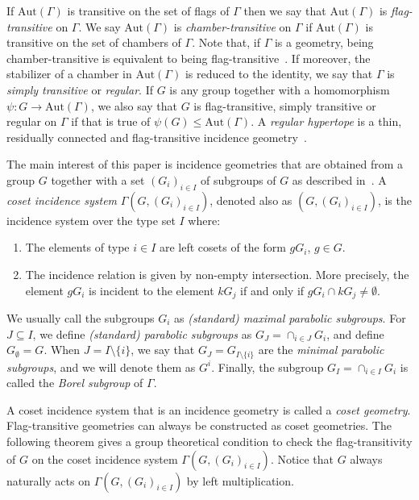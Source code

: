 \documentclass[11pt,letterpaper]{amsart}
\newtheorem{definition}[prop]{Definition}
\newcommand{\Aut}{\mathrm{Aut}}
\begin{document}
If $\Aut(\Gamma)$ is transitive on the set of flags of $\Gamma$ then we say that $\Aut(\Gamma)$ is {\em flag-transitive} on $\Gamma$. We say $\Aut(\Gamma)$ is {\em chamber-transitive} on $\Gamma$ if $\Aut(\Gamma)$ is transitive on the set of chambers of $\Gamma$. Note that, if $\Gamma$ is a geometry, being chamber-transitive is equivalent to being flag-transitive~\cite[Proposition 2.2]{hypertopes}. If moreover, the stabilizer of a chamber in $\Aut(\Gamma)$ is reduced to the identity, we say that $\Gamma$ is {\em simply transitive} or {\em regular}. If $G$ is any group together with a homomorphism $\psi \colon G \to \Aut(\Gamma)$, we also say that $G$ is flag-transitive, simply transitive or regular on $\Gamma$ if that is true of $\psi(G) \leq \Aut(\Gamma)$.
A \textit{regular hypertope} is a thin, residually connected and flag-transitive incidence geometry~\cite{hypertopes}.

The main interest of this paper is incidence geometries that are obtained from a group $G$ together with a set $(G_i)_{i \in I}$ of subgroups of $G$ as described in~\cite{Tits1957}. 
    A \emph{coset incidence system} $\Gamma(G,(G_i)_{i \in I})$, denoted also as $(G,(G_i)_{i \in I})$, is the incidence system over the type set $I$ where:
    \begin{enumerate}
        \item The elements of type $i \in I$ are left cosets of the form $g G_i $, $g \in G$.
        \item The incidence relation is given by non-empty intersection. More precisely, the element $g G_i$ is incident to the element $k G_j $ if and only if $g G_i \cap k G_j \neq \emptyset$.
    \end{enumerate}
We usually call the subgroups $G_i$ as \emph{(standard) maximal parabolic subgroups}. For $J\subseteq I$, we define \emph{(standard) parabolic subgroups} as $G_J=\cap_{i\in J} G_i$, and define $G_\emptyset=G$.
When $J=I\setminus\{i\}$, we say that $G_J=G_{I\setminus\{i\}}$ are the \emph{minimal parabolic subgroups}, and we will denote them as $G^i$. Finally, the subgroup $G_I=\cap_{i\in I} G_i$ is called the \emph{Borel subgroup} of $\Gamma$. 
    
A coset incidence system that is an incidence geometry is called a \emph{coset geometry}.
Flag-transitive geometries can always be constructed as coset geometries.
The following theorem gives a group theoretical condition to check the flag-transitivity of $G$ on the coset incidence system $\Gamma(G,(G_i)_{i\in I})$. Notice that $G$ always naturally acts on $\Gamma(G,(G_i)_{i \in I})$ by left multiplication.
\end{document}
